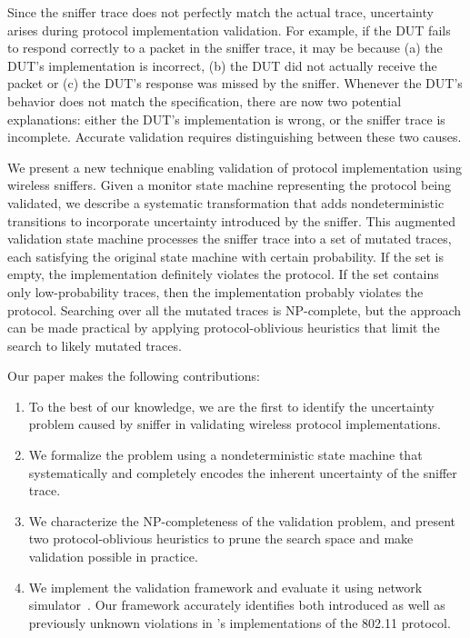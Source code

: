Since the sniffer trace does not perfectly match the actual trace,
uncertainty arises during protocol implementation validation.
For example, if the DUT fails to respond correctly to a packet in the sniffer
trace, it may be because (a) the DUT's implementation is incorrect, (b) the DUT
did not actually receive the packet or (c) the DUT's response was missed by the
sniffer.
Whenever the DUT's behavior does not match the specification, there are now two
potential explanations:
either the DUT's implementation is wrong, or the sniffer trace is incomplete.
Accurate validation requires  distinguishing between these two
causes.

We present a new technique enabling  validation of protocol
implementation using wireless sniffers.
Given a monitor state machine representing the protocol being validated, we describe a
systematic transformation that adds nondeterministic transitions to
incorporate uncertainty introduced by the sniffer.
This augmented validation state machine processes the sniffer trace into a set
of mutated traces, each satisfying the original state machine with certain
probability.
If the set is empty, the implementation definitely violates the protocol.
If the set contains only low-probability traces, then the implementation
probably violates the protocol.
Searching over all the mutated traces is NP-complete, but the approach can be made
practical by applying protocol-oblivious heuristics that limit the search to
likely mutated traces.

Our paper makes the following contributions:
\begin{enumerate}
		  \item To the best of our knowledge, we are the first to identify the
    uncertainty problem caused by sniffer in validating wireless protocol
    implementations.
		  \item We formalize the problem using a nondeterministic state machine that
    systematically and completely encodes the inherent uncertainty of the
    sniffer trace.
		    \item We characterize the NP-completeness of the validation problem, and
      present two protocol-oblivious heuristics to prune the search
      space and make validation possible in practice.
			\item We implement the validation framework and evaluate it using
    \ns{} network simulator~\cite{riley2010ns}.
		    Our framework accurately identifies both introduced as well as previously
    unknown violations in \ns{}'s implementations of the 802.11 protocol.
\end{enumerate}

